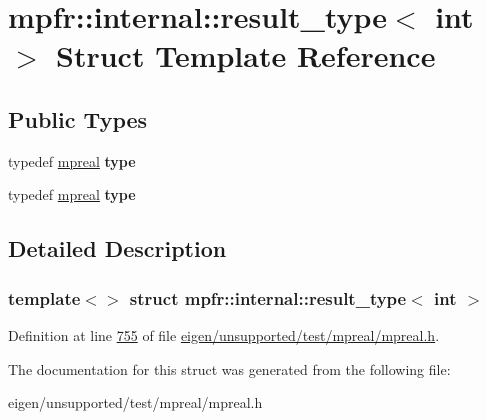 \hypertarget{structmpfr_1_1internal_1_1result__type_3_01int_01_4}{}\section{mpfr\+:\+:internal\+:\+:result\+\_\+type$<$ int $>$ Struct Template Reference}
\label{structmpfr_1_1internal_1_1result__type_3_01int_01_4}
\subsection*{Public Types}
\begin{DoxyCompactItemize}
\item 
\mbox{\label{structmpfr_1_1internal_1_1result__type_3_01int_01_4_a838990117f9c1ca891396e313712218c}} 
typedef \hyperlink{classmpfr_1_1mpreal}{mpreal} {\bfseries type}
\item 
\mbox{\label{structmpfr_1_1internal_1_1result__type_3_01int_01_4_a838990117f9c1ca891396e313712218c}} 
typedef \hyperlink{classmpfr_1_1mpreal}{mpreal} {\bfseries type}
\end{DoxyCompactItemize}


\subsection{Detailed Description}
\subsubsection*{template$<$$>$\newline
struct mpfr\+::internal\+::result\+\_\+type$<$ int $>$}



Definition at line \hyperlink{eigen_2unsupported_2test_2mpreal_2mpreal_8h_source_l00755}{755} of file \hyperlink{eigen_2unsupported_2test_2mpreal_2mpreal_8h_source}{eigen/unsupported/test/mpreal/mpreal.\+h}.



The documentation for this struct was generated from the following file\+:\begin{DoxyCompactItemize}
\item 
eigen/unsupported/test/mpreal/mpreal.\+h\end{DoxyCompactItemize}
